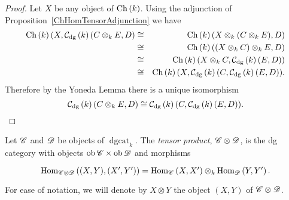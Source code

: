 \documentclass[dissertation.tex]{subfiles}
\begin{document}
\begin{eg}
\begin{description}[style=nextline]
\begin{prop}
      \begin{proof}
        Let $X$ be any object of $\operatorname{Ch}\left(k\right)$.
        Using the adjunction of Proposition~\ref{ChHomTensorAdjunction} we have
        \begin{eqnarray*}
          \operatorname{Ch}\left(k\right)(X,\mathcal{C}_\text{dg}\left(k\right)(C \otimes_k E, D) &\cong& 
          \operatorname{Ch}\left(k\right)(X \otimes_k (C \otimes_k E), D)\\
          &\cong& \operatorname{Ch}\left(k\right)((X \otimes_k C) \otimes_k E, D)\\
          &\cong& \operatorname{Ch}\left(k\right)(X \otimes_k C, \mathcal{C}_\text{dg}\left(k\right)(E,D))\\
          &\cong& \operatorname{Ch}\left(k\right)(X, \mathcal{C}_\text{dg}\left(k\right)(C, \mathcal{C}_\text{dg}\left(k\right)(E,D)).
        \end{eqnarray*}
        Therefore by the Yoneda Lemma there is a unique isomorphism 
        $$\mathcal{C}_\text{dg}\left(k\right)(C \otimes_k E, D) \cong \mathcal{C}_\text{dg}\left(k\right)(C, \mathcal{C}_\text{dg}\left(k\right)(E,D)).$$
      \end{proof}
    \end{prop}
  \end{description}
\end{eg}

\begin{defn}
  Let $\mathscr{C}$ and $\mathscr{D}$ be objects of $\operatorname{dgcat}_k$.
  The {\it tensor product}, $\mathscr{C} \otimes \mathscr{D}$, is the dg category with objects $\operatorname{ob}\mathscr{C} \times \operatorname{ob}\mathscr{D}$ and
  morphisms
  $$\begin{tikzcd}
    \Hom{\CC \otimes \D}{(X, Y), (X^\prime, Y^\prime)} = \Hom{\CC}{X,X^\prime} \otimes_k \Hom{\D}{Y,Y^\prime}.
  \end{tikzcd}$$
  For ease of notation, we will denote by $X \otimes Y$ the object $(X,Y)$ of $\mathscr{C} \otimes \mathscr{D}$.
\end{defn}
\end{document}
